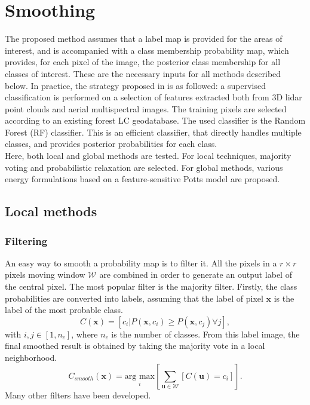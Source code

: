 \section{Smoothing}
The proposed method assumes that a label map is provided for the areas of interest, and is accompanied with a class membership probability map, which provides, for each pixel of the image, the posterior class membership for all classes of interest. These are the necessary inputs for all methods described below. In practice, the strategy proposed in \cite{clement_IJPRS} is as followed: a supervised classification is performed on a selection of features extracted both from 3D lidar point clouds and aerial multispectral images. The training pixels are selected according to an existing forest LC geodatabase. The used classifier is the Random Forest (RF) classifier. This is an efficient classifier, that directly handles multiple classes, and provides posterior probabilities for each class.\\
Here, both local and global methods are tested. For local techniques, majority voting and probabilistic relaxation are selected. For global methods, various energy formulations based on a feature-sensitive Potts model are proposed.

\subsection{Local methods}
\subsubsection{Filtering}
An easy way to smooth a probability map is to filter it. All the pixels in a $r \times r$ pixels moving window $\mathcal{W}$ are combined in order to generate an output label of the central pixel. The most popular filter is the majority filter. Firstly, the class probabilities are converted into labels, assuming that the label of pixel $\mathbf{x}$ is the label of the most probable class.\\
\begin{equation}
C(\mathbf{x})=[c_{i}|P(\mathbf{x},c_{i}) \geq P(\mathbf{x},c_{j}) \forall j],
\end{equation}
with $i,j \in [1,n_{c}]$, where $n_{c}$ is the number of classes. From this label image, the final smoothed result is obtained by taking the majority vote in a local neighborhood.
\begin{equation}
C_{smooth}(\mathbf{x})=\underset{i}{\text{arg max}}\left[ \sum_{\mathbf{u}\in\mathcal{W}}\left[C(\mathbf{u})=c_{i}\right] \right].
\end{equation}
Many other filters have been developed.


